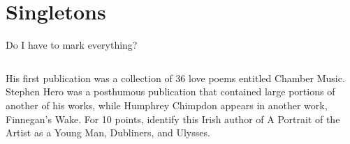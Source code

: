 \documentclass[compress]{beamer}
\begin{document}
\section{Singletons}

\begin{frame}{Do I have to mark everything?}

\begin{columns}

\alert<2,10>{His} first publication was \alert<3,10>{a collection of 36 love poems} entitled \alert<3,10>{Chamber Music}. \alert<4,10>{Stephen Hero} was a posthumous publication that contained large portions of \alert<7,10>{another of \alert<2,10>{his} works}, while \alert<5,10>{Humphrey Chimpdon} appears in another work, \alert<6,10>{Finnegan's Wake}. For 10 points, identify \alert<2,10>{this Irish author of \alert<7,10>{A Portrait of the Artist as a Young Man}, \alert<8,10>{Dubliners}, and \alert<9,10>{Ulysses}}.








\end{columns}
\end{frame}
\end{document}
